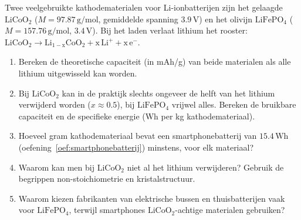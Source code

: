 \begin{oefening}
Twee veelgebruikte kathodematerialen voor Li-ionbatterijen zijn het gelaagde \(\mathrm{LiCoO_2}\) (\(M = 97.87\,\mathrm{g/mol}\), gemiddelde spanning \(3.9\,\mathrm{V}\)) en het olivijn \(\mathrm{LiFePO_4}\) (\(M = 157.76\,\mathrm{g/mol}\), \(3.4\,\mathrm{V}\)). Bij het laden verlaat lithium het rooster: \(\mathrm{LiCoO_2 \rightarrow Li_{1-x}CoO_2 + x\,Li^+ + x\,e^-}\).

\begin{enumerate}
\item[(a)]
  Bereken de theoretische capaciteit (in mAh/g) van beide materialen als alle lithium uitgewisseld kan worden.
\item[(b)]
  Bij \(\mathrm{LiCoO_2}\) kan in de praktijk slechts ongeveer de helft van het lithium verwijderd worden (\(x \approx 0.5\)), bij \(\mathrm{LiFePO_4}\) vrijwel alles. Bereken de bruikbare capaciteit en de specifieke energie (Wh per kg kathodemateriaal).
\item[(c)]
  Hoeveel gram kathodemateriaal bevat een smartphonebatterij van \(15.4\,\mathrm{Wh}\) (oefening~\ref{oef:smartphonebatterij}) minstens, voor elk materiaal?
\item[(d)]
  Waarom kan men bij \(\mathrm{LiCoO_2}\) niet al het lithium verwijderen? Gebruik de begrippen non-stoichiometrie en kristalstructuur.
\item[(e)]
  Waarom kiezen fabrikanten van elektrische bussen en thuisbatterijen vaak voor \(\mathrm{LiFePO_4}\), terwijl smartphones \(\mathrm{LiCoO_2}\)-achtige materialen gebruiken?
\end{enumerate}
\end{oefening}
